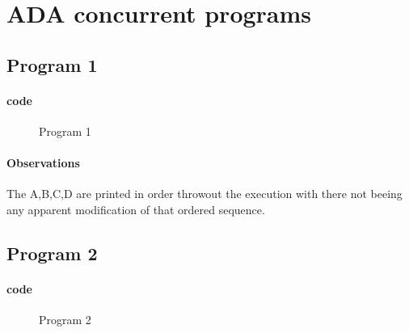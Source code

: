 \documentclass[10pt,a4paper]{article}
\begin{document}
\section{ADA concurrent programs}
\subsection{Program 1}
\paragraph{code}
\begin{figure}[H]
\begin{center}

\caption{Program 1}
\end{center}

\end{figure}

\paragraph{Observations}
The A,B,C,D are printed in order throwout the execution with there not beeing any apparent modification of that ordered sequence.
\subsection{Program 2}
\paragraph{code}
\begin{figure}[H]
\begin{center}

\caption{Program 2}
\end{center}
\end{figure}
\end{document}
